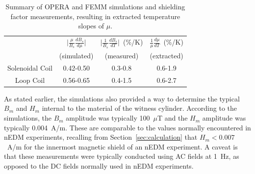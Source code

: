 \begin{table}
\begin{center}
\begin{tabular}{|c|c|c|c|}
\hline 
  & $\vert \frac{\mu}{B_s}\frac{dB_s}{d\mu}\vert$ & $\vert \frac{1}{B_s} \frac{dB_s}{dT}\vert$~(\%/K) & $\frac{1}{\mu}\frac{d\mu}{dT}$~(\%/K) \\ 
 & (simulated) & (measured) & (extracted) \\
\hline 
Solenoidal Coil & 0.42-0.50 & 0.3-0.8 & 0.6-1.9 \\ 
\hline 
Loop Coil & 0.56-0.65 & 0.4-1.5 & 0.6-2.7 \\ 
\hline 
\end{tabular} 
\caption{Summary of OPERA and FEMM simulations and shielding factor
  measurements, resulting in extracted temperature slopes of $\mu$.}
\label{tab:axialsummary}
\end{center}

\end{table}


As stated earlier, the simulations also provided a way to determine
the typical $B_m$ and $H_m$ internal to the material of the witness
cylinder.  According to the simulations, the $B_m$ amplitude was
typically 100~$\mu$T and the $H_m$ amplitude was typically 0.004~A/m.
These are comparable to the values normally encountered in nEDM
experiments, recalling from Section~\ref{sec:calculation} that
$H_m<0.007$~A/m for the innermost magnetic shield of an nEDM
experiment.  A caveat is that these measurements were typically
conducted using AC fields at 1~Hz, as opposed to the DC fields
normally used in nEDM experiments.
